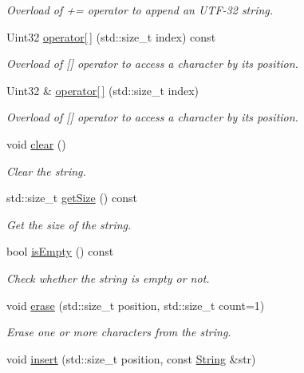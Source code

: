 \begin{DoxyCompactItemize}
\begin{DoxyCompactList}\small\item\em Overload of += operator to append an U\+T\+F-\/32 string. \end{DoxyCompactList}\item 
Uint32 \hyperlink{classsf_1_1String_a035c1b585a0ebed81e773ecafed57926}{operator\mbox{[}$\,$\mbox{]}} (std\+::size\+\_\+t index) const
\begin{DoxyCompactList}\small\item\em Overload of \mbox{[}\mbox{]} operator to access a character by its position. \end{DoxyCompactList}\item 
Uint32 \& \hyperlink{classsf_1_1String_abc989da7f4fb873ab29188d40772ab24}{operator\mbox{[}$\,$\mbox{]}} (std\+::size\+\_\+t index)
\begin{DoxyCompactList}\small\item\em Overload of \mbox{[}\mbox{]} operator to access a character by its position. \end{DoxyCompactList}\item 
void \hyperlink{classsf_1_1String_a391c1b4950cbf3d3f8040cea73af2969}{clear} ()
\begin{DoxyCompactList}\small\item\em Clear the string. \end{DoxyCompactList}\item 
std\+::size\+\_\+t \hyperlink{classsf_1_1String_ae7aff54e178f5d3e399953adff5cad20}{get\+Size} () const
\begin{DoxyCompactList}\small\item\em Get the size of the string. \end{DoxyCompactList}\item 
bool \hyperlink{classsf_1_1String_a2ba26cb6945d2bbb210b822f222aa7f6}{is\+Empty} () const
\begin{DoxyCompactList}\small\item\em Check whether the string is empty or not. \end{DoxyCompactList}\item 
void \hyperlink{classsf_1_1String_aaa78a0a46b3fbe200a4ccdedc326eb93}{erase} (std\+::size\+\_\+t position, std\+::size\+\_\+t count=1)
\begin{DoxyCompactList}\small\item\em Erase one or more characters from the string. \end{DoxyCompactList}\item 
void \hyperlink{classsf_1_1String_ad0b1455deabf07af13ee79812e05fa02}{insert} (std\+::size\+\_\+t position, const \hyperlink{classsf_1_1String}{String} \&str)

\end{DoxyCompactItemize}
